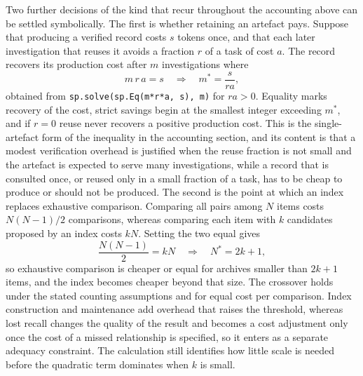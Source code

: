 \documentclass[11pt]{article}
\theoremstyle{remark}
\begin{document}
Two further decisions of the kind that recur throughout the accounting above can be settled symbolically. The first is whether retaining an artefact pays. Suppose that producing a verified record costs $s$ tokens once, and that each later investigation that reuses it avoids a fraction $r$ of a task of cost $a$. The record recovers its production cost after $m$ investigations where
\begin{equation}
m\,r\,a = s \quad\Longrightarrow\quad m^{*} = \frac{s}{r a},
\end{equation}
obtained from \verb|sp.solve(sp.Eq(m*r*a, s), m)| for $ra > 0$. Equality marks recovery of the cost, strict savings begin at the smallest integer exceeding $m^{*}$, and if $r = 0$ reuse never recovers a positive production cost. This is the single-artefact form of the inequality in the accounting section, and its content is that a modest verification overhead is justified when the reuse fraction is not small and the artefact is expected to serve many investigations, while a record that is consulted once, or reused only in a small fraction of a task, has to be cheap to produce or should not be produced. The second is the point at which an index replaces exhaustive comparison. Comparing all pairs among $N$ items costs $N(N-1)/2$ comparisons, whereas comparing each item with $k$ candidates proposed by an index costs $kN$. Setting the two equal gives
\begin{equation}
\frac{N(N-1)}{2} = kN \quad\Longrightarrow\quad N^{*} = 2k + 1,
\end{equation}
so exhaustive comparison is cheaper or equal for archives smaller than $2k+1$ items, and the index becomes cheaper beyond that size. The crossover holds under the stated counting assumptions and for equal cost per comparison. Index construction and maintenance add overhead that raises the threshold, whereas lost recall changes the quality of the result and becomes a cost adjustment only once the cost of a missed relationship is specified, so it enters as a separate adequacy constraint. The calculation still identifies how little scale is needed before the quadratic term dominates when $k$ is small.
\end{document}
